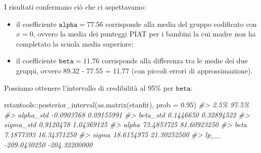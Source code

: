 \documentclass[
]{memoir}
\newenvironment{Shaded}{\begin{snugshade}}{\end{snugshade}}
\newcommand{\AttributeTok}[1]{\textcolor[rgb]{0.77,0.63,0.00}{#1}}
\newcommand{\CommentTok}[1]{\textcolor[rgb]{0.56,0.35,0.01}{\textit{#1}}}
\newcommand{\FloatTok}[1]{\textcolor[rgb]{0.00,0.00,0.81}{#1}}
\newcommand{\FunctionTok}[1]{\textcolor[rgb]{0.00,0.00,0.00}{#1}}
\newcommand{\NormalTok}[1]{#1}
\newcommand{\SpecialCharTok}[1]{\textcolor[rgb]{0.00,0.00,0.00}{#1}}
\newcommand{\StringTok}[1]{\textcolor[rgb]{0.31,0.60,0.02}{#1}}
\providecommand{\tightlist}{%
  \setlength{\itemsep}{0pt}\setlength{\parskip}{0pt}}
\begin{document}
\begin{Shaded}
\end{Shaded}

\noindent
I risultati confermano ciò che ci aspettavamo:

\begin{itemize}
\tightlist
\item
  il coefficiente \(\texttt{alpha} = 77.56\) corrisponde alla media del gruppo codificato con \(x = 0\), ovvero la media dei punteggi PIAT per i bambini la cui madre non ha completato la scuola media superiore;
\item
  il coefficiente \(\texttt{beta} = 11.76\) corrisponde alla differenza tra le medie dei due gruppi, ovvero 89.32 - 77.55 = 11.77 (con piccoli errori di approssimazione).
\end{itemize}

\noindent
Possiamo ottenere l'intervallo di credibilità al 95\% per \(\texttt{beta}\):

\begin{Shaded}
\begin{Highlighting}[]
\NormalTok{rstantools}\SpecialCharTok{::}\FunctionTok{posterior\_interval}\NormalTok{(}\FunctionTok{as.matrix}\NormalTok{(stanfit), }\AttributeTok{prob =} \FloatTok{0.95}\NormalTok{)}
\CommentTok{\#\textgreater{}                   2.5\%         97.5\%}
\CommentTok{\#\textgreater{} alpha\_std   {-}0.0903768    0.09155991}
\CommentTok{\#\textgreater{} beta\_std     0.1446650    0.32894522}
\CommentTok{\#\textgreater{} sigma\_std    0.9120478    1.04369125}
\CommentTok{\#\textgreater{} alpha       73.4853725   81.60923250}
\CommentTok{\#\textgreater{} beta         7.1877393   16.34371250}
\CommentTok{\#\textgreater{} sigma       18.6154975   21.30252500}
\CommentTok{\#\textgreater{} lp\_\_      {-}209.0430250 {-}204.32200000}
\end{Highlighting}
\end{Shaded}
\end{document}
